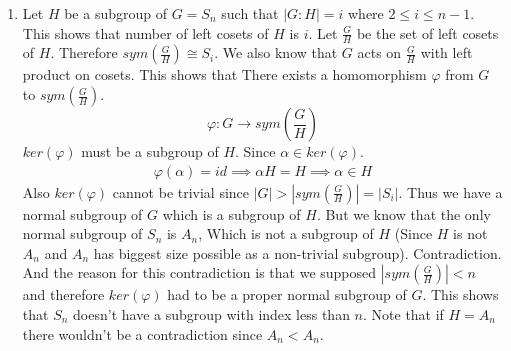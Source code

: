 \begin{enumerate}[label=]
    \item 
        Let $H$ be a subgroup of $G = S_n$ such that $|G:H| = i$ where $2 \le i \le n - 1$.
        This shows that number of left cosets of $H$ is $i$. Let $\frac{G }{H }$ be the set of left cosets of $H$. Therefore $sym(\frac{G }{H }) \cong S_i$. We also know that $G$ acts on $\frac{G }{H}$ with left product on cosets. This shows that There exists a homomorphism $\varphi$ from $G$ to $sym(\frac{G }{H })$.
        \[\varphi: G \to sym(\frac{G }{H })\]
        $ker(\varphi)$ must be a subgroup of $H$. Since $\alpha \in ker(\varphi)$.
        \begin{gather*}
            \varphi(\alpha) = id \implies \alpha H = H \implies \alpha \in H
        \end{gather*}
        Also $ker(\varphi)$ cannot be trivial since $|G| > |sym(\frac{G }{H })| = |S_i|$. Thus we have a normal subgroup of $G$ which is a subgroup of $H$. But we know that the only normal subgroup of $S_n$ is $A_n$, Which is not a subgroup of $H$ (Since $H$ is not $A_n$ and $A_n$ has biggest size possible as a non-trivial subgroup). Contradiction. And the reason for this contradiction is that we supposed $|sym(\frac{G }{H })| < n$ and therefore $ker(\varphi)$ had to be a proper normal subgroup of $G$.
        This shows that $S_n$ doesn't have a subgroup with index less than $n$. Note that if $H = A_n$ there wouldn't be a contradiction since $A_n < A_n$.
\end{enumerate}